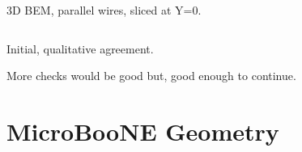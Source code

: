 \documentclass[xcolor=dvipsnames]{beamer}
\begin{document}
\begin{frame}
\begin{columns}
\begin{column}{0.5\textwidth}
\begin{center}
        \scriptsize 3D BEM, parallel wires, sliced at Y=0.
      \end{center}
    \end{column}
  \end{columns}

  \begin{center}\footnotesize
    Initial, qualitative agreement.  

    More checks would be good but, good enough to continue.
  \end{center}

\end{frame}


\section{MicroBooNE Geometry}
\end{document}
